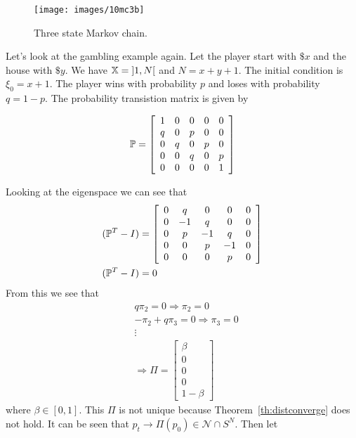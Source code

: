 \begin{figure}[ht!]
\centering
\texttt{[image: images/10mc3b]}
\caption{Three state Markov chain.}%
\label{fig:10mc3b}
\end{figure}

\begin{example}%
\label{ex:gambling}
Let's look at the gambling example again.
Let the player start with $\$x$ and the house with $\$y$.
We have $\mathbb{X}=\interval[open]{1}{N}$ and $N=x+y+1$.
The initial condition is $\xi_0=x+1$.
The player wins with probability $p$ and loses with probability $q=1-p$.
The probability transistion matrix is given by

\begin{equation*}
\mathbb{P} = \left[\begin{array}{c c c c c} 1 & 0 & 0 & 0 & 0 \\ q & 0 & p & 0 & 0 \\ 0 & q & 0 & p & 0 \\ 0 & 0 & q & 0 & p \\ 0 & 0 & 0 & 0 & 1 \end{array}\right]
\end{equation*}

Looking at the eigenspace we can see that
\begin{align*}
&(\mathbb{P}^T-I) = \left[\begin{array}{c c c c c} 0 & q & 0 & 0 & 0 \\ 0 & -1 & q & 0 & 0 \\ 0 & p & -1 & q & 0 \\ 0 & 0 & p & -1 & 0 \\ 0 & 0 & 0 & p & 0 \end{array}\right] \\
& (\mathbb{P}^T-I) = 0
\end{align*}
From this we see that
\begin{align*}
&q\pi_2 = 0 \Rightarrow \pi_2=0 \\
&-\pi_2+q\pi_3 = 0 \Rightarrow \pi_3=0 \\
&\vdots \\
&\Rightarrow \Pi = \left[\begin{array}{c} \beta \\ 0 \\ 0 \\ 0 \\ 1-\beta \end{array}\right]
\end{align*}
where $\beta\in[0,1]$.
This $\Pi$ is not unique because Theorem~\ref{th:distconverge} does not hold.
It can be seen that $p_t\rightarrow \Pi(p_0)\in\mathcal{N}\cap S^N$.
Then let


\end{example}

